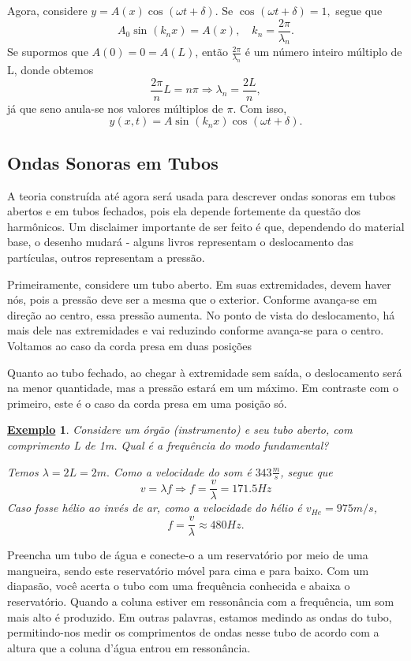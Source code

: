 \documentclass{article}
\newtheorem{example}{\underline{Exemplo}}
\begin{document}
  Agora, considere \(y = A(x)\cos^{}{(\omega t + \delta )}\). Se \(\cos^{}{(\omega t + \delta )}=1,\) segue que 
    \[
      A_{0}\sin^{}{(k_{n}x)} = A(x),\quad k_{n} = \frac{2\pi }{\lambda_{n}}.
    \]
  Se supormos que \(A(0) = 0 = A(L)\), então \(\frac{2\pi }{\lambda_{n}}\) é um número inteiro múltiplo de L, donde obtemos 
    \[
      \frac{2\pi }{n}L = n\pi \Rightarrow \lambda_{n} = \frac{2L}{n},
    \]
  já que seno anula-se nos valores múltiplos de \(\pi \). Com isso, 
    \[
      y(x, t) = A\sin^{}{(k_{n}x)}\cos^{}{(\omega t + \delta )}.
    \]
\subsection{Ondas Sonoras em Tubos}
  A teoria construída até agora será usada para descrever ondas sonoras em tubos abertos e em tubos fechados, pois ela depende fortemente
da questão dos harmônicos. Um disclaimer importante de ser feito é que, dependendo do material base, o desenho mudará - alguns livros representam
o deslocamento das partículas, outros representam a pressão.

  Primeiramente, considere um tubo aberto. Em suas extremidades, devem haver nós, pois a pressão deve ser a mesma que o exterior. Conforme avança-se
em direção ao centro, essa pressão aumenta. No ponto de vista do deslocamento, há mais dele nas extremidades e vai reduzindo conforme avança-se para o
centro. Voltamos ao caso da corda presa em duas posições

  Quanto ao tubo fechado, ao chegar à extremidade sem saída, o deslocamento será na menor quantidade, mas a pressão estará em um máximo.
Em contraste com o primeiro, este é o caso da corda presa em uma posição só.
 \begin{example}
   Considere um órgão (instrumento) e seu tubo aberto, com comprimento L de 1m. Qual é a frequência do modo fundamental?

   Temos \(\lambda  = 2L = 2m. \) Como a velocidade do som é \(343 \frac{m}{s}\), segue que 
    \[
     v = \lambda f \Rightarrow f = \frac{v}{\lambda } = 171.5 Hz 
    \]
  Caso fosse hélio ao invés de ar, como a velocidade do hélio é \(v_{He} = 975m/s\), 
    \[
      f = \frac{v}{\lambda } \approx 480Hz.
    \]
 \end{example}
  Preencha um tubo de água e conecte-o a um reservatório por meio de uma mangueira, sendo este reservatório móvel para cima e para baixo. Com um diapasão, 
você acerta o tubo com uma frequência conhecida e abaixa o reservatório. Quando a coluna estiver em ressonância com a frequência, um som mais alto é produzido.
Em outras palavras, estamos medindo as ondas do tubo, permitindo-nos medir os comprimentos de ondas nesse tubo de acordo com a altura que a coluna d'água entrou em ressonância.
\end{document}
